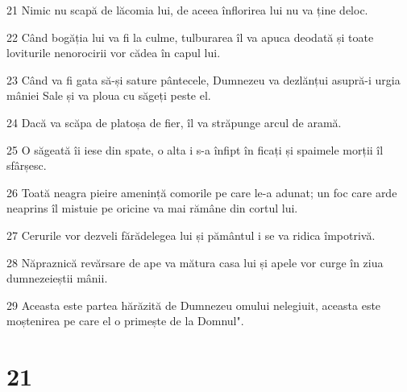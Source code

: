 \par 21 Nimic nu scapă de lăcomia lui, de aceea înflorirea lui nu va ține deloc.
\par 22 Când bogăția lui va fi la culme, tulburarea îl va apuca deodată și toate loviturile nenorocirii vor cădea în capul lui.
\par 23 Când va fi gata să-și sature pântecele, Dumnezeu va dezlănțui asupră-i urgia mâniei Sale și va ploua cu săgeți peste el.
\par 24 Dacă va scăpa de platoșa de fier, îl va străpunge arcul de aramă.
\par 25 O săgeată îi iese din spate, o alta i s-a înfipt în ficați și spaimele morții îl sfârșesc.
\par 26 Toată neagra pieire amenință comorile pe care le-a adunat; un foc care arde neaprins îl mistuie pe oricine va mai rămâne din cortul lui.
\par 27 Cerurile vor dezveli fărădelegea lui și pământul i se va ridica împotrivă.
\par 28 Năpraznică revărsare de ape va mătura casa lui și apele vor curge în ziua dumnezeieștii mânii.
\par 29 Aceasta este partea hărăzită de Dumnezeu omului nelegiuit, aceasta este moștenirea pe care el o primește de la Domnul".

\chapter{21}

